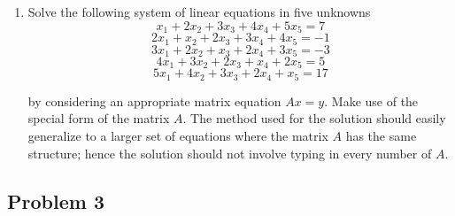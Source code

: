 \documentclass[11pt,a4paper]{article}
\begin{document}
\begin{enumerate}
	\item Solve the following system of linear equations in five unknowns
	$$x_{1} + 2x_{2} + 3x_{3} + 4x_{4} + 5x_{5} = 7$$
	$$2x_{1} + x_{2} + 2x_{3} + 3x_{4} + 4x_{5} = -1$$
	$$3x_{1} + 2x_{2} + x_{3} + 2x_{4} + 3x_{5} = -3$$
	$$4x_{1} + 3x_{2} + 2x_{3} + x_{4} + 2x_{5} = 5$$
	$$5x_{1} + 4x_{2} + 3x_{3} + 2x_{4} + x_{5} = 17$$
	
	by considering an appropriate matrix equation $Ax = y$.
	Make use of the special form of the matrix $A$. The method used for the solution should easily generalize to a larger set of equations where the matrix $A$ has the same structure; hence the solution should not involve typing in every number of $A$.
	\end{enumerate}	

\subsection*{Problem 3}
\end{document}
